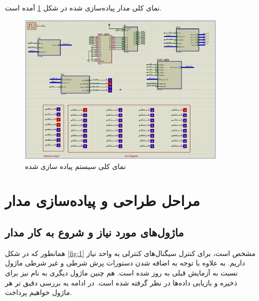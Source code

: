 \documentclass[12pt,onecolumn,a4paper,fleqn]{article}
\begin{document}
	نمای کلی مدار پیاده‌سازی شده در شکل \ref{fig:2} آمده است.
	\begin{figure}[H]
		\centering
		\includegraphics[width=0.9\textwidth]{source/circuit.png}
		\caption{نمای کلی سیستم پیاده سازی شده}
		\label{fig:2}
	\end{figure}
	
	\pagebreak
	\section{مراحل طراحی و پیاده‌سازی مدار}
	\subsection {ماژول‌های مورد نیاز و شروع به کار مدار}
	همانطور که در شکل \ref{fig:1} مشخص است، برای کنترل سیگنال‌های کنترلی به واحد  نیاز داریم. به علاوه با توجه به اضافه شدن دستورات پرش شرطی و غیر شرطی ماژول  نسبت به آزمایش قبلی به روز شده است. هم چنین ماژول دیگری به نام  نیز برای ذخیره و بازیابی داده‌ها در نظر گرفته شده است. در ادامه به بررسی دقیق تر هر ماژول خواهیم پرداخت.
\end{document}
